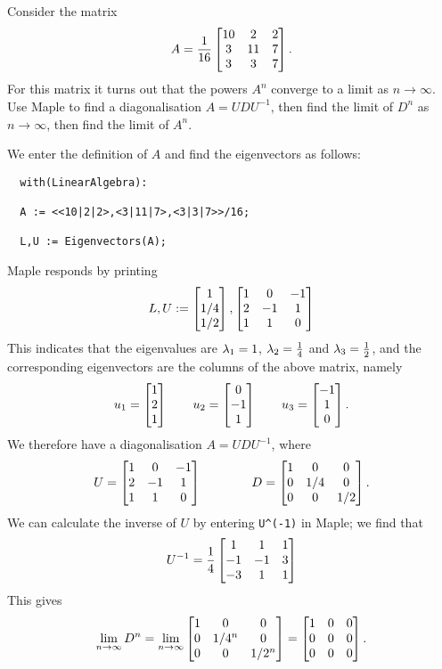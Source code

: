 \documentclass[a4paper]{amsart}
\renewenvironment{solution}{\SolutionInline}{\endSolutionInline}
\begin{document}
\begin{exercise}\label{ex-powers-ii}
 Consider the matrix
 \[ A = \frac{1}{16} \left[\begin{matrix} 10 & 2 & 2 \\ 3 & 11 & 7 \\ 3 & 3 & 7 \end{matrix}\right].
 \]
 For this matrix it turns out that the powers $A^n$ converge to a
 limit as $n\to\infty$.  Use Maple to find a diagonalisation
 $A=UDU^{-1}$, then find the limit of $D^n$ as $n\to\infty$, then find
 the limit of $A^n$.
\end{exercise}
\begin{solution}
 We enter the definition of $A$ and find the eigenvectors as follows:
 \begin{verbatim}
  with(LinearAlgebra):

  A := <<10|2|2>,<3|11|7>,<3|3|7>>/16;

  L,U := Eigenvectors(A);
 \end{verbatim}
 Maple responds by printing
 \[ L,U := \left[\begin{matrix} 1\\ 1/4\\ 1/2\end{matrix}\right],
           \left[\begin{matrix} 1 & 0 & -1 \\ 2 & -1 & 1 \\ 1 & 1 & 0 \end{matrix}\right]
 \]
 This indicates that the eigenvalues are $\lambda_1=1$,
 $\lambda_2=\tfrac{1}{4}$ and $\lambda_3=\tfrac{1}{2}$, and the corresponding
 eigenvectors are the columns of the above matrix, namely
 \[ u_1 = \left[\begin{matrix} 1 \\ 2 \\ 1 \end{matrix}\right]\qquad
    u_2 = \left[\begin{matrix} 0 \\ -1 \\ 1 \end{matrix}\right]\qquad
    u_3 = \left[\begin{matrix} -1 \\ 1 \\ 0 \end{matrix}\right].
 \]
 We therefore have a diagonalisation $A=UDU^{-1}$, where 
 \[ U = \left[\begin{matrix} 1 & 0 & -1 \\ 2 & -1 & 1 \\ 1 & 1 & 0 \end{matrix}\right]
    \hspace{4em}
    D = \left[\begin{matrix} 1 & 0 & 0 \\ 0 & 1/4 & 0 \\ 0 & 0 & 1/2 \end{matrix}\right].
 \]
 We can calculate the inverse of $U$ by entering \verb+U^(-1)+ in
 Maple; we find that 
 \[ U^{-1} = \frac{1}{4} \left[\begin{matrix} 1&1&1 \\ -1&-1&3 \\ -3&1&1 \end{matrix}\right] \]
 This gives
 \[ \lim_{n\to\infty} D^n = 
    \lim_{n\to\infty} 
     \left[\begin{matrix} 1 & 0 & 0 \\ 0 & 1/4^n & 0 \\ 0 & 0 & 1/2^n \end{matrix}\right] = 
     \left[\begin{matrix} 1 & 0 & 0 \\ 0 & 0 & 0 \\ 0 & 0 & 0 \end{matrix}\right].
\]
\end{solution}
\end{document}
